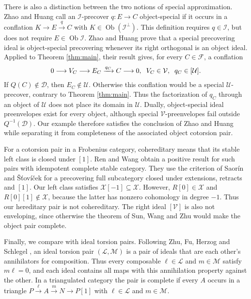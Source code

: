 \documentclass[11pt,a4paper,reqno]{amsart}
\newcommand{\Dcal}{\mathcal D}
\newcommand{\Ical}{\mathcal I}
\newcommand{\Xcal}{\mathcal X}
\theoremstyle{plain}
\theoremstyle{definition}
\theoremstyle{remark}
\newcommand{\Fcal}{\mathcal F}
\newcommand{\Ucal}{\mathcal U}
\newcommand{\Vcal}{\mathcal V}
\newcommand{\Ob}{\operatorname{Ob}}
\begin{document}
There is also a distinction between the two notions of special approximation. Zhao and Huang \cite[Definition~5.1]{ZH19} call an $\Ical$-precover $q:E\to C$ object-special if it occurs in a conflation $K\to E\xrightarrow{q}C$ with $K\in\Ob(\Ical^\perp)$. This definition requires $q\in\Ical$, but does not require $E\in\Ob\Ical$. Zhao and Huang \cite[Proposition~5.2]{ZH19} prove that a special precovering ideal is object-special precovering whenever its right orthogonal is an object ideal. Applied to Theorem \ref{thm:main}, their result gives, for every $C\in\Fcal$, a conflation
$$
0\longrightarrow V_C\longrightarrow E_C\xrightarrow{q_C}C\longrightarrow0,
\hspace{2mm}V_C\in\Vcal,\hspace{2mm}q_C\in[\Ucal].
$$
If $Q(C)\notin\Dcal$, then $E_C\notin\Ucal$. Otherwise this conflation would be a special $\Ucal$-precover, contrary to Theorem \ref{thm:main}. Thus the factorization of $q_C$ through an object of $\Ucal$ does not place its domain in $\Ucal$. Dually, object-special ideal preenvelopes exist for every object, although special $\Vcal$-preenvelopes fail outside $Q^{-1}(\Dcal)$. Our example therefore satisfies the conclusion of Zhao and Huang while separating it from completeness of the associated object cotorsion pair.

For a cotorsion pair in a Frobenius category, cohereditary means that its stable left class is closed under $[1]$. Ren and Wang \cite[Corollary~4.5]{RW26} obtain a positive result for such pairs with idempotent complete stable category. They use the criterion of Saor\'in and \v{S}\v{t}ov\'i\v{c}ek \cite[Proposition~3.11]{SS11} for a precovering full subcategory closed under extensions, retracts and $[1]$. Our left class satisfies $\Xcal[-1]\subseteq\Xcal$. However, $R[0]\in\Xcal$ and $R[0][1]\notin\Xcal$, because the latter has nonzero cohomology in degree $-1$. Thus our hereditary pair is not cohereditary. The right ideal $[\Vcal]$ is also not enveloping, since otherwise the theorem of Sun, Wang and Zhu \cite[Theorem~3.6(2)]{SWZ24} would make the object pair complete.

Finally, we compare with ideal torsion pairs. Following Zhu, Fu, Herzog and Schlegel \cite[Definition~2, Theorem~19 and Example~23]{ZFHS25}, an ideal torsion pair $(\mathcal L,\mathcal M)$ is a pair of ideals that are each other's annihilators for composition. Thus every composable $\ell\in\mathcal L$ and $m\in\mathcal M$ satisfy $m\ell=0$, and each ideal contains all maps with this annihilation property against the other. In a triangulated category the pair is complete if every $A$ occurs in a triangle $P\xrightarrow{\ell}A\xrightarrow{m}N\to P[1]$ with $\ell\in\mathcal L$ and $m\in\mathcal M$.
\end{document}
